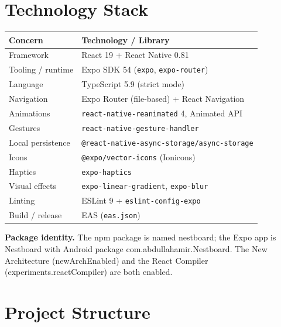\documentclass[11pt,a4paper]{article}
\newcommand{\code}[1]{\colorbox{codebg}{\ttfamily\small #1}}
\begin{document}
\section{Technology Stack}

\begin{longtable}{@{}p{}p{}@{}}
  \toprule
  \textbf{Concern} & \textbf{Technology / Library} \\
  \midrule
  \endhead
  Framework            & React 19 + React Native 0.81 \\
  Tooling / runtime    & Expo SDK 54 (\texttt{expo}, \texttt{expo-router}) \\
  Language             & TypeScript 5.9 (strict mode) \\
  Navigation           & Expo Router (file-based) + React Navigation \\
  Animations           & \texttt{react-native-reanimated} 4, Animated API \\
  Gestures             & \texttt{react-native-gesture-handler} \\
  Local persistence    & \texttt{@react-native-async-storage/async-storage} \\
  Icons                & \texttt{@expo/vector-icons} (Ionicons) \\
  Haptics              & \texttt{expo-haptics} \\
  Visual effects       & \texttt{expo-linear-gradient}, \texttt{expo-blur} \\
  Linting              & ESLint 9 + \texttt{eslint-config-expo} \\
  Build / release      & EAS (\texttt{eas.json}) \\
  \bottomrule
\end{longtable}

\begin{notebox}
\textbf{Package identity.} The npm package is named \code{nestboard}; the Expo
app is \code{Nestboard} with Android package
\code{com.abdullahamir.Nestboard}. The New Architecture (\code{newArchEnabled})
and the React Compiler (\code{experiments.reactCompiler}) are both enabled.
\end{notebox}

\section{Project Structure}
\end{document}
